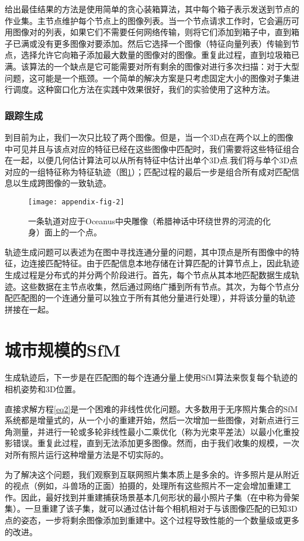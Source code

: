 \begin{translation}
给出最佳结果的方法是使用简单的贪心装箱算法，其中每个箱子表示发送到节点的作业集。主节点维护每个节点上的图像列表。当一个节点请求工作时，它会遍历可用图像对的列表，如果它们不需要任何网络传输，则将它们添加到箱子中，直到箱子已满或没有更多图像对要添加。然后它选择一个图像（特征向量列表）传输到节点，选择允许它向箱子添加最大数量的图像对的图像。重复此过程，直到垃圾箱已满。该算法的一个缺点是它可能需要对所有剩余的图像对进行多次扫描：对于大型问题，这可能是一个瓶颈。一个简单的解决方案是只考虑固定大小的图像对子集进行调度。这种窗口化方法在实践中效果很好，我们的实验使用了这种方法。

\subsubsection{跟踪生成}
\label{sec-4-3-3}
到目前为止，我们一次只比较了两个图像。但是，当一个3D点在两个以上的图像中可见并且与该点对应的特征已经在这些图像中匹配时，我们需要将这些特征组合在一起，以便几何估计算法可以从所有特征中估计出单个3D点.我们将与单个3D点对应的一组特征称为特征轨迹（图\ref{appendix-fig-2}）；匹配过程的最后一步是组合所有成对匹配信息以生成跨图像的一致轨迹。
\begin{figure}
	\centering
	\texttt{[image: appendix-fig-2]}
	\caption[]{一条轨道对应于Oceanus中央雕像（希腊神话中环绕世界的河流的化身）面上的一个点。}
	\label{appendix-fig-2}
\end{figure}

轨迹生成问题可以表述为在图中寻找连通分量的问题，其中顶点是所有图像中的特征，边连接匹配特征。由于匹配信息本地存储在计算匹配的计算节点上，因此轨迹生成过程是分布式的并分两个阶段进行。首先，每个节点从其本地匹配数据生成轨迹。这些数据在主节点收集，然后通过网络广播到所有节点。其次，为每个节点分配匹配图的一个连通分量可以独立于所有其他分量进行处理），并将该分量的轨迹拼接在一起。

\section{城市规模的SfM}
生成轨迹后，下一步是在匹配图的每个连通分量上使用SfM算法来恢复每个轨迹的相机姿势和3D位置。

直接求解方程\ref{eq2}是一个困难的非线性优化问题。大多数用于无序照片集合的SfM系统都是增量式的，从一个小的重建开始，然后一次增加一些图像，对新点进行三角测量，并进行一轮或多轮非线性最小二乘优化（称为光束平差法\cite{triggs1999bundle}）以最小化重投影错误。重复此过程，直到无法添加更多图像。然而，由于我们收集的规模，一次对所有照片运行这种增量方法是不切实际的。

为了解决这个问题，我们观察到互联网照片集本质上是多余的。许多照片是从附近的视点（例如，斗兽场的正面）拍摄的，处理所有这些照片不一定会增加重建工作。因此，最好找到并重建捕获场景基本几何形状的最小照片子集（在\citet{snavely2008skeletal}中称为骨架集）。一旦重建了该子集，就可以通过估计每个相机相对于与该图像匹配的已知3D点的姿态，一步将剩余图像添加到重建中。这个过程导致性能的一个数量级或更多的改进。


\end{translation}
